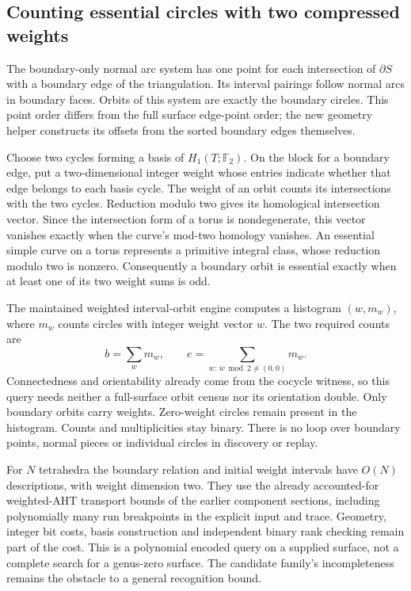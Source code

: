 \subsection{Counting essential circles with two compressed weights}

The boundary-only normal arc system has one point for each intersection
of $\partial S$ with a boundary edge of the triangulation. Its interval
pairings follow normal arcs in boundary faces. Orbits of this system are
exactly the boundary circles. This point order differs from the full
surface edge-point order; the new geometry helper constructs its offsets
from the sorted boundary edges themselves.

Choose two cycles forming a basis of $H_1(T;\mathbb F_2)$. On the block
for a boundary edge, put a two-dimensional integer weight whose entries
indicate whether that edge belongs to each basis cycle. The weight of an
orbit counts its intersections with the two cycles. Reduction modulo two
gives its homological intersection vector. Since the intersection form of
a torus is nondegenerate, this vector vanishes exactly when the curve's
mod-two homology vanishes. An essential simple curve on a torus represents
a primitive integral class, whose reduction modulo two is nonzero.
Consequently a boundary orbit is essential exactly when at least one
of its two weight sums is odd.

The maintained weighted interval-orbit engine computes a histogram
$(w,m_w)$, where $m_w$ counts circles with integer weight vector $w$.
The two required counts are
\[
 b=\sum_w m_w,\qquad
 e=\sum_{w:\,w\bmod2\ne(0,0)}m_w.
\]
Connectedness and orientability already come from the cocycle witness,
so this query needs neither a full-surface orbit census nor its orientation
double. Only boundary orbits carry weights.
Zero-weight circles remain present in the histogram. Counts and
multiplicities stay binary. There is no loop over boundary points, normal
pieces or individual circles in discovery or replay.

For $N$ tetrahedra the boundary relation and initial weight intervals have
$O(N)$ descriptions, with weight dimension two. They use the already
accounted-for weighted-AHT transport bounds of the earlier component
sections, including polynomially many run breakpoints in the explicit
input and trace. Geometry, integer bit costs, basis construction and
independent binary rank checking remain part of the cost. This is a
polynomial encoded query on a supplied surface, not a complete search for
a genus-zero surface. The candidate family's incompleteness remains the
obstacle to a general recognition bound.

